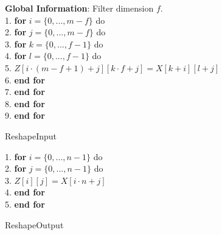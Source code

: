 \begin{algorithm}[h]
\textbf{Global Information}: Filter dimension $f$.\\
1. \textbf{for} $i = \{0, ..., m-f\}$ do \\
2. \hspace{10mm} \textbf{for} $j = \{0, ..., m-f\}$ do \\
3. \hspace{10mm} \hspace{10mm} \textbf{for} $k = \{0, ..., f-1\}$ do \\
4. \hspace{10mm} \hspace{10mm} \hspace{10mm} \textbf{for} $l = \{0, ..., f-1\}$ do \\
5. \hspace{10mm} \hspace{10mm} \hspace{10mm} \hspace{10mm} $Z[i \cdot (m-f+1) + j][k\cdot f+j] = X[k+i][l+j]$\\
6. \hspace{10mm} \hspace{10mm} \hspace{10mm} \textbf{end for}\\
7. \hspace{10mm} \hspace{10mm} \textbf{end for}\\
8. \hspace{10mm} \textbf{end for}\\
9. \textbf{end for}

    \caption{{ ReshapeInput} \label{algo:reshapeinput}}

\end{algorithm}

\begin{algorithm}[h]
1. \textbf{for} $i = \{0, ..., n-1\}$ do \\
2. \hspace{10mm} \textbf{for} $j = \{0, ..., n-1\}$ do \\
3. \hspace{10mm} \hspace{10mm} $Z[i][j] = X[i\cdot n + j]$\\
4. \hspace{10mm} \textbf{end for}\\
5. \textbf{end for}

    \caption{{ ReshapeOutput} \label{algo:reshapeoutput}}

\end{algorithm}

